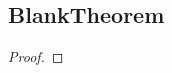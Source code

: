 \documentclass[../../main.tex]{subfiles}
\begin{document}
\providecommand{\xn}{\{x_n\}}
\subsection{BlankTheorem}
\begin{wts}
    
\end{wts}
\begin{proof}

\end{proof}
\end{document}
